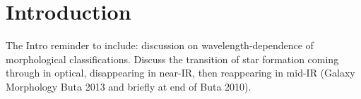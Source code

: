\chapter{Introduction}
\label{chap:intro}

The Intro
reminder to include: discussion on wavelength-dependence of morphological classifications. Discuss the transition of star formation coming through in optical, disappearing in near-IR, then reappearing in mid-IR (Galaxy Morphology Buta 2013 and briefly at end of Buta 2010).  







